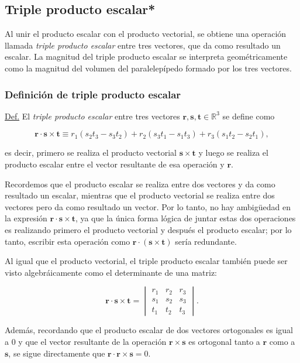 \documentclass[12pt]{article}
\begin{document}
\newpage
\subsection{Triple producto escalar*}

Al unir el producto escalar con el producto vectorial, se obtiene una operación llamada \emph{triple producto escalar} entre tres vectores, que da como resultado un escalar. La magnitud del triple producto escalar se interpreta geométricamente como la magnitud del volumen del paralelepípedo formado por los tres vectores.

\subsubsection{Definición de triple producto escalar}
\begin{tcolorbox}
\underline{Def.} El \emph{triple producto escalar} entre tres vectores $\mathbf{r},\mathbf{s},\mathbf{t}\in\mathbb{R}^3$ se define como

$$\mathbf{r}\cdot\mathbf{s}\times\mathbf{t} \equiv r_1(s_2t_3-s_3t_2) + r_2(s_3t_1-s_1t_3) + r_3(s_1t_2-s_2t_1),$$

\noindent es decir, primero se realiza el producto vectorial $\mathbf{s}\times\mathbf{t}$ y luego se realiza el producto escalar entre el vector resultante de esa operación y $\mathbf{r}$.
\end{tcolorbox}

Recordemos que el producto escalar se realiza entre dos vectores y da como resultado un escalar, mientras que el producto vectorial se realiza entre dos vectores pero da como resultado un vector. Por lo tanto, no hay ambigüedad en la expresión $\mathbf{r}\cdot\mathbf{s}\times\mathbf{t}$, ya que la única forma lógica de juntar estas dos operaciones es realizando primero el producto vectorial y después el producto escalar; por lo tanto, escribir esta operación como $\mathbf{r}\cdot(\mathbf{s}\times\mathbf{t})$ sería redundante.

Al igual que el producto vectorial, el triple producto escalar también puede ser visto algebráicamente como el determinante de una matriz:

$$\mathbf{r}\cdot\mathbf{s}\times\mathbf{t} = \begin{vmatrix} r_1&r_2&r_3 \\ s_1&s_2&s_3 \\ t_1&t_2&t_3 \end{vmatrix}.$$

Además, recordando que el producto escalar de dos vectores ortogonales es igual a $0$ y que el vector resultante de la operación $\mathbf{r}\times\mathbf{s}$ es ortogonal tanto a $\mathbf{r}$ como a $\mathbf{s}$, se sigue directamente que $\mathbf{r}\cdot\mathbf{r}\times\mathbf{s}=0$.
\end{document}
